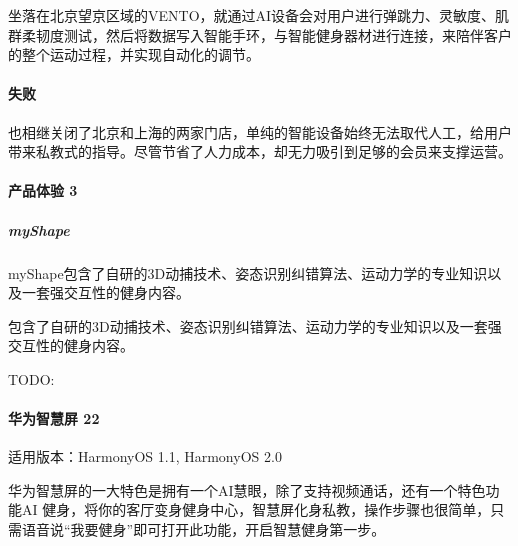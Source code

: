 \documentclass[letterpaper,10pt,english]{sphinxmanual}
\begin{document}
坐落在北京望京区域的VENTO，就通过AI设备会对用户进行弹跳力、灵敏度、肌群柔韧度测试，然后将数据写入智能手环，与智能健身器材进行连接，来陪伴客户的整个运动过程，并实现自动化的调节。


\paragraph{失败}
\label{\detokenize{chapter_project/AI_fit:id4}}
也相继关闭了北京和上海的两家门店，单纯的智能设备始终无法取代人工，给用户带来私教式的指导。尽管节省了人力成本，却无力吸引到足够的会员来支撑运营。


\paragraph{产品体验 3\sphinxfootnotemark[758]}
\label{\detokenize{chapter_project/AI_fit:id5}}%
\begin{footnotetext}[758]\sphinxAtStartFootnote
{}
%
\end{footnotetext}\ignorespaces 

\subparagraph{myShape}
\label{\detokenize{chapter_project/AI_fit:myshape}}

myShape包含了自研的3D动捕技术、姿态识别纠错算法、运动力学的专业知识以及一套强交互性的健身内容。

包含了自研的3D动捕技术、姿态识别纠错算法、运动力学的专业知识以及一套强交互性的健身内容。

TODO:


\paragraph{华为智慧屏 22\sphinxfootnotemark[759]}
\label{\detokenize{chapter_project/AI_fit:id6}}%
\begin{footnotetext}[759]\sphinxAtStartFootnote
{}
%
\end{footnotetext}\ignorespaces 
适用版本：HarmonyOS 1.1, HarmonyOS 2.0

华为智慧屏的一大特色是拥有一个AI慧眼，除了支持视频通话，还有一个特色功能AI
健身，将你的客厅变身健身中心，智慧屏化身私教，操作步骤也很简单，只需语音说“我要健身”即可打开此功能，开启智慧健身第一步。%
\begin{footnote}[760]\sphinxAtStartFootnote
{}
%
\end{footnote}
\end{document}
